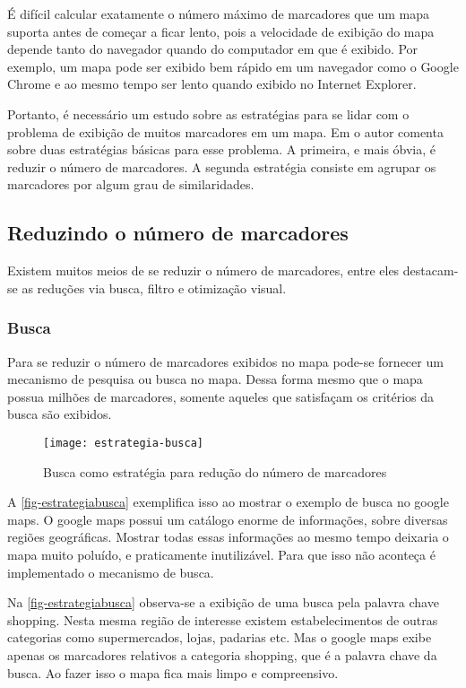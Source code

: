 	É difícil calcular exatamente o número máximo de marcadores que um mapa suporta antes de começar a ficar lento, pois a velocidade de exibição do mapa depende tanto do navegador quando do computador em que é exibido. Por exemplo, um mapa pode ser exibido bem rápido em um navegador como o Google Chrome e ao mesmo tempo ser lento quando exibido no Internet Explorer.\cite[177]{livroGoogleApiV3}
	
    Portanto, é necessário um estudo sobre as  estratégias para se lidar com o problema de exibição de muitos marcadores em um mapa. Em \cite[capítulo~9]{livroGoogleApiV3} o autor comenta sobre duas estratégias básicas para esse problema. A primeira, e mais óbvia, é reduzir o número de marcadores. A segunda estratégia consiste em agrupar os marcadores por algum grau de similaridades.
    
  \subsection{Reduzindo o número de marcadores}
  Existem muitos meios de se reduzir o número de marcadores, entre eles destacam-se as reduções via busca, filtro e otimização visual.
	\subsubsection{Busca}
	Para se reduzir  o número de marcadores exibidos no mapa pode-se fornecer um mecanismo de pesquisa ou busca no mapa. Dessa forma mesmo que o mapa possua milhões de marcadores, somente aqueles que satisfaçam os critérios da busca são exibidos.
	
	 \begin{figure}[htb]
	\caption{\label{fig-estrategiabusca}Busca como estratégia para redução do número de marcadores}
	\begin{center}
	    \texttt{[image: estrategia-busca]}
	\end{center}
	\end{figure}
	 
	 A \autoref{fig-estrategiabusca}  exemplifica isso ao mostrar o exemplo de busca no google maps. O google maps possui um catálogo enorme de informações, sobre diversas regiões geográficas. Mostrar todas essas informações ao mesmo tempo deixaria o mapa muito poluído, e praticamente inutilizável. Para que isso não aconteça é implementado o mecanismo de busca.
	
	 Na \autoref{fig-estrategiabusca} observa-se a exibição de uma busca pela palavra chave shopping. Nesta mesma região de interesse existem estabelecimentos de outras categorias como supermercados, lojas, padarias etc. Mas o google maps exibe apenas os marcadores relativos a categoria shopping, que é a palavra chave da busca. Ao fazer isso o mapa fica mais limpo e compreensivo.
	 

